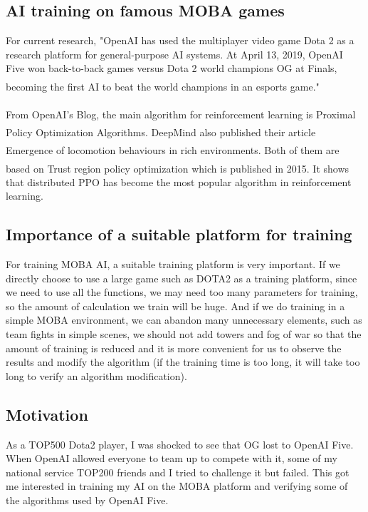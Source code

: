 \documentclass[runningheads]{llncs}
\newcommand{\upcite}[1]{\textsuperscript{\textsuperscript{\cite{#1}}}}
\begin{document}
\subsection{AI training on famous MOBA games}
\qquad For current research, "OpenAI has used the multiplayer video game Dota 2 as a research platform for general-purpose AI systems. At April 13, 2019, OpenAI Five won back-to-back games versus Dota 2 world champions OG at Finals, becoming the first AI to beat the world champions in an esports game."\upcite{OpenAI-Blog}

From OpenAI's Blog\upcite{OpenAI-baselines-ppo}, the main algorithm for reinforcement learning is Proximal Policy Optimization Algorithms.\upcite{OpenAI-PPO} DeepMind also published their article Emergence of locomotion behaviours in rich environments\upcite{Deep-Mind}. Both of them are based on Trust region policy optimization\upcite{2015} which is published in 2015. It shows that distributed PPO has become the most popular algorithm in reinforcement learning.
\subsection{Importance of a suitable platform for training}
\qquad For training MOBA AI, a suitable training platform is very important. If we directly choose to use a large game such as DOTA2 as a training platform, since we need to use all the functions, we may need too many parameters for training, so the amount of calculation we train will be huge. And if we do training in a simple MOBA environment, we can abandon many unnecessary elements, such as team fights in simple scenes, we should not add towers and fog of war so that the amount of training is reduced and it is more convenient for us to observe the results and modify the algorithm (if the training time is too long, it will take too long to verify an algorithm modification).

\subsection{Motivation}
\qquad As a TOP500 Dota2 player, I was shocked to see that OG lost to OpenAI Five. When OpenAI allowed everyone to team up to compete with it, some of my national service TOP200 friends and I tried to challenge it but failed. This got me interested in training my AI on the MOBA platform and verifying some of the algorithms used by OpenAI Five.
\end{document}
